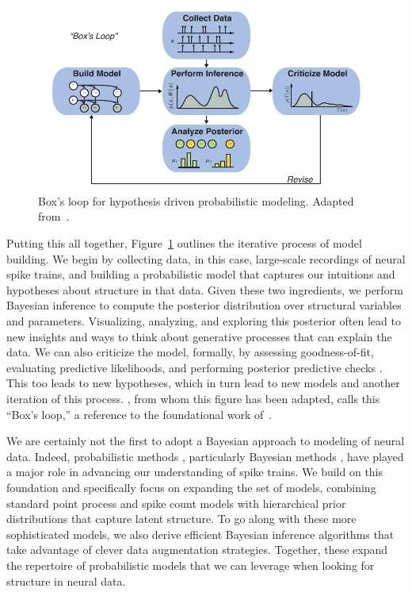 \begin{figure}[t]
  \centering%
\includegraphics[width=5.5in]{figures/ch1/boxloop} 
\caption[Box's Loop]{Box's loop for hypothesis driven probabilistic modeling.
Adapted from~\citet{blei2014build}.}
\label{fig:boxloop}
\end{figure}

Putting this all together, 
Figure~\ref{fig:boxloop} outlines the iterative process of model building.
We begin by collecting data, in this case, large-scale recordings of neural
spike trains, and building a probabilistic model that captures our 
intuitions and hypotheses about structure in that data. Given these two 
ingredients, we perform Bayesian inference to compute the posterior 
distribution over structural variables and parameters. Visualizing, analyzing, and 
exploring this posterior often lead to new insights and ways to think 
about generative processes that can explain the data. We can also 
criticize the model, formally, by assessing goodness-of-fit, evaluating 
predictive likelihoods, and performing posterior predictive checks 
\citep{Gelman13}. This too leads to new hypotheses, which in turn lead to 
new models and another iteration of this process.
\citet{blei2014build}, from whom this
figure has been adapted, calls this ``Box's loop,'' a reference to the 
foundational work of~\citet{box1980sampling}. 



We are certainly not the first to adopt a Bayesian approach to modeling 
of neural data. Indeed, probabilistic methods \citep[e.g.]{brillinger1976identification,
Brillinger-1988, Paninski-2004, Truccolo-2005, Pillow-2008}, 
particularly Bayesian methods \citep[e.g.]{sahani1999latent, rieke1999spikes, Yu09,
park2011bayesian, macke2011empirical}, 
have played a major role in advancing our understanding of spike trains. 
We build on this foundation and specifically focus on expanding the 
set of models, combining standard point process and spike count models with 
hierarchical prior distributions that capture latent structure. To go 
along with these more sophisticated models, we also derive efficient 
Bayesian inference algorithms that take advantage of clever data augmentation 
strategies. Together, these expand the repertoire of probabilistic models 
that we can leverage when looking for structure in neural data.


